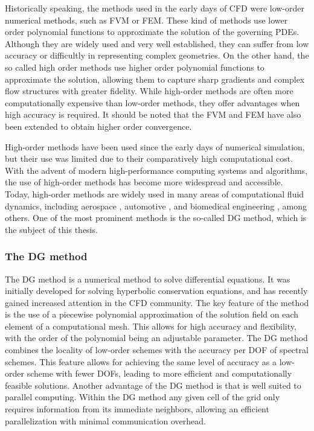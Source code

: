Historically speaking, the methods used in the early days of CFD were low-order numerical methods, such as \gls{FVM} or \gls{FEM}. These kind of methods use lower order polynomial functions to approximate the solution of the governing \glspl{PDE}. Although they are widely used and very well established, they can suffer from  low accuracy or difficultly in representing complex geometries. On the other hand, the so called high order methods use higher order polynomial functions to approximate the solution, allowing them to capture sharp gradients and complex flow structures with greater fidelity. While high-order methods are often more computationally expensive than low-order methods, they offer advantages when high accuracy is required. It should be noted that the \Gls{FVM} and \Gls{FEM} have also been extended to obtain higher order convergence.

High-order methods have been used since the early days of numerical simulation, but their use was limited due to their comparatively high computational cost. With the advent of modern high-performance computing systems and algorithms, the use of high-order methods has become more widespread and accessible. Today, high-order methods are widely used in many areas of computational fluid dynamics, including aerospace \parencite{mavriplisProgessHighOrderDiscontinuous2009}, automotive \parencite{colomboAssessmentDiscontinuousGalerkin2021}, and biomedical engineering \parencite{fehnModernDiscontinuousGalerkin2019}, among others. One of the most prominent methods is the so-called \gls{DG} method, which is the subject of this thesis.

\subsubsection{The \Gls{DG} method}
The \gls{DG} method is a numerical method to solve differential equations. It was initially developed for solving hyperbolic conservation equations, and has recently gained increased attention in the \gls{CFD} community. The key feature of the method is the use of a piecewise polynomial approximation of the solution field on each element of a computational mesh. This allows for high accuracy and flexibility, with the order of the polynomial being an adjustable parameter. 
The DG method combines the locality of low-order schemes with the accuracy per \gls{DOF} of spectral schemes. This feature allows for achieving the same level of accuracy as a low-order scheme with fewer \glspl{DOF}, leading to more efficient and computationally feasible solutions.  Another advantage of the  DG method is that is well suited to parallel computing. Within the DG method any given cell of the grid only requires information from its immediate neighbors, allowing an efficient parallelization with minimal communication overhead.

